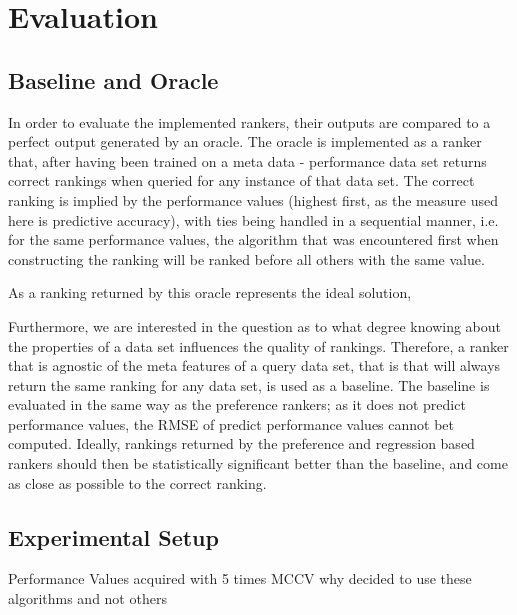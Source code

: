 %
\chapter{Evaluation}
\label{sec:evaluation}

\section{Baseline and Oracle}
In order to evaluate the implemented rankers, their outputs are compared to a perfect output generated by an oracle. The oracle is implemented as a ranker that, after having been trained on a meta data - performance data set returns correct rankings when queried for any instance of that data set. The correct ranking is implied by the performance values (highest first, as the measure used here is predictive accuracy), with ties being handled in a sequential manner, i.e. for the same performance values, the algorithm that was encountered first when constructing the ranking will be ranked before all others with the same value.

As a ranking returned by this oracle represents the ideal solution, 

Furthermore, we are interested in the question as to what degree knowing about the properties of a data set influences the quality of rankings. Therefore, a ranker that is agnostic of the meta features of a query data set, that is that will always return the same ranking for any data set, is used as a baseline. The baseline is evaluated in the same way as the preference rankers; as it does not predict performance values, the RMSE of predict performance values cannot bet computed. Ideally, rankings returned by the preference and regression based rankers should then be statistically significant better than the baseline, and come as close as possible to the correct ranking.

\section{Experimental Setup}


Performance Values acquired with 5 times MCCV
why decided to use these algorithms and not others


